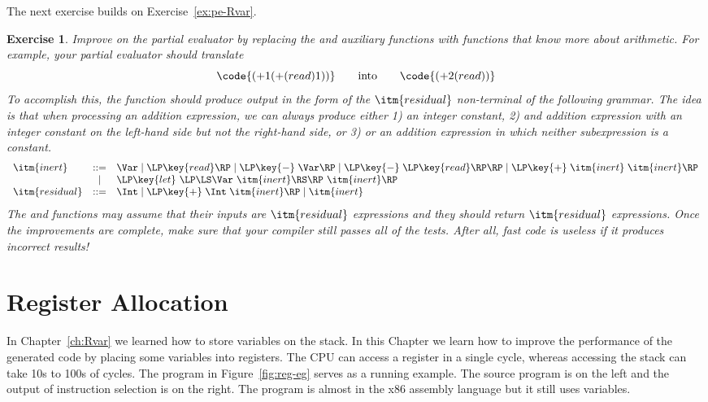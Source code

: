 \documentclass[11pt]{book}
\newtheorem{exercise}[theorem]{Exercise}
\begin{document}
The next exercise builds on Exercise~\ref{ex:pe-Rvar}.

\begin{exercise}
\normalfont

Improve on the partial evaluator by replacing the  and
 auxiliary functions with functions that know more about
arithmetic. For example, your partial evaluator should translate
\[
\code{(+ 1 (+ (read) 1))} \qquad \text{into} \qquad
\code{(+ 2 (read))}
\]
To accomplish this, the  function should produce output
in the form of the $\itm{residual}$ non-terminal of the following
grammar. The idea is that when processing an addition expression, we
can always produce either 1) an integer constant, 2) and addition
expression with an integer constant on the left-hand side but not the
right-hand side, or 3) or an addition expression in which neither
subexpression is a constant.
\[
\begin{array}{lcl}
\itm{inert} &::=& \Var \mid \LP\key{read}\RP \mid \LP\key{-} \;\Var\RP
    \mid \LP\key{-} \;\LP\key{read}\RP\RP
    \mid \LP\key{+} \; \itm{inert} \; \itm{inert}\RP\\
  &\mid& \LP\key{let}~\LP\LS\Var~\itm{inert}\RS\RP~ \itm{inert} \RP \\
\itm{residual} &::=& \Int \mid \LP\key{+}\; \Int\; \itm{inert}\RP \mid \itm{inert} 
\end{array}
\]
The  and  functions may assume that their
inputs are $\itm{residual}$ expressions and they should return
$\itm{residual}$ expressions.  Once the improvements are complete,
make sure that your compiler still passes all of the tests.  After
all, fast code is useless if it produces incorrect results!
\end{exercise}



\chapter{Register Allocation}
\label{ch:register-allocation-Rvar}


In Chapter~\ref{ch:Rvar} we learned how to store variables on the
stack. In this Chapter we learn how to improve the performance of the
generated code by placing some variables into registers.  The CPU can
access a register in a single cycle, whereas accessing the stack can
take 10s to 100s of cycles.  The program in Figure~\ref{fig:reg-eg}
serves as a running example. The source program is on the left and the
output of instruction selection is on the right. The program is almost
in the x86 assembly language but it still uses variables.
\end{document}
